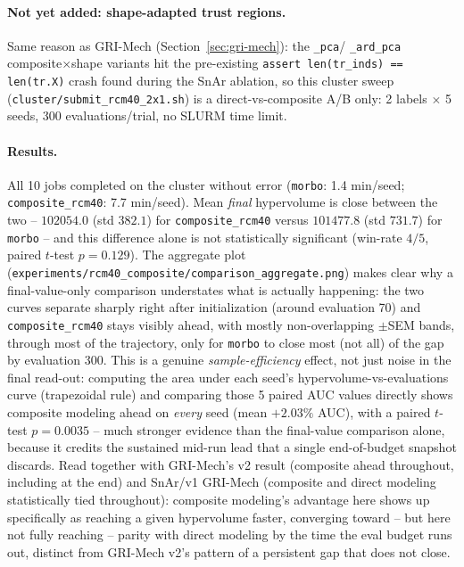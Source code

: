 \documentclass[11pt]{article}
\begin{document}
\paragraph{Not yet added: shape-adapted trust regions.} Same reason
as GRI-Mech (Section~\ref{sec:gri-mech}): the \texttt{\_pca}/
\texttt{\_ard\_pca} composite$\times$shape variants hit the pre-existing
\texttt{assert len(tr\_inds) == len(tr.X)} crash found during the SnAr
ablation, so this cluster sweep
(\texttt{cluster/submit\_rcm40\_2x1.sh}) is a direct-vs-composite A/B
only: 2 labels $\times$ 5 seeds, 300 evaluations/trial, no SLURM time
limit.

\paragraph{Results.} All 10 jobs completed on the cluster without error
(\texttt{morbo}: 1.4 min/seed; \texttt{composite\_rcm40}: 7.7 min/seed).
Mean \emph{final} hypervolume is close between the two --
$102054.0$ (std $382.1$) for \texttt{composite\_rcm40} versus
$101477.8$ (std $731.7$) for \texttt{morbo} -- and this difference alone
is not statistically significant (win-rate $4/5$, paired $t$-test
$p=0.129$). The aggregate plot
(\texttt{experiments/rcm40\_composite/comparison\_aggregate.png}) makes
clear why a final-value-only comparison understates what is actually
happening: the two curves separate sharply right after initialization
(around evaluation 70) and \texttt{composite\_rcm40} stays visibly ahead,
with mostly non-overlapping $\pm$SEM bands, through most of the
trajectory, only for \texttt{morbo} to close most (not all) of the gap
by evaluation 300. This is a genuine \emph{sample-efficiency} effect,
not just noise in the final read-out: computing the area under each
seed's hypervolume-vs-evaluations curve (trapezoidal rule) and comparing
those 5 paired AUC values directly shows composite modeling ahead on
\emph{every} seed (mean $+2.03\%$ AUC), with a paired $t$-test
$p=0.0035$ -- much stronger evidence than the final-value comparison
alone, because it credits the sustained mid-run lead that a single
end-of-budget snapshot discards. Read together with GRI-Mech's v2
result (composite ahead throughout, including at the end) and SnAr/v1
GRI-Mech (composite and direct modeling statistically tied throughout):
composite modeling's advantage here shows up specifically as reaching a
given hypervolume faster, converging toward -- but here not fully
reaching -- parity with direct modeling by the time the eval budget
runs out, distinct from GRI-Mech v2's pattern of a persistent gap that
does not close.
\end{document}
